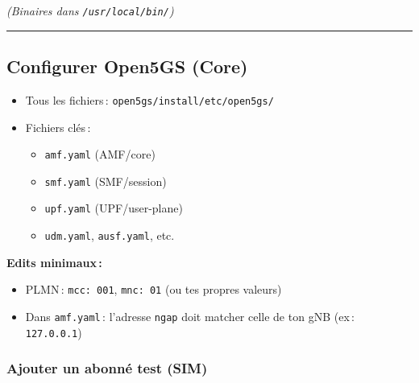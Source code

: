 \documentclass[
  french,
]{article}
\newenvironment{Shaded}{\begin{snugshade}}{\end{snugshade}}
\newcommand{\AttributeTok}[1]{\textcolor[rgb]{0.13,0.29,0.53}{#1}}
\newcommand{\BuiltInTok}[1]{#1}
\newcommand{\FunctionTok}[1]{\textcolor[rgb]{0.13,0.29,0.53}{\textbf{#1}}}
\newcommand{\KeywordTok}[1]{\textcolor[rgb]{0.13,0.29,0.53}{\textbf{#1}}}
\newcommand{\NormalTok}[1]{#1}
\newcommand{\VariableTok}[1]{\textcolor[rgb]{0.00,0.00,0.00}{#1}}
\providecommand{\tightlist}{%
  \setlength{\itemsep}{0pt}\setlength{\parskip}{0pt}}
\begin{document}
\begin{Shaded}
\end{Shaded}

\emph{(Binaires dans \texttt{/usr/local/bin/})}

\begin{center}\rule{0.5\linewidth}{0.5pt}\end{center}

\subsection{Configurer Open5GS (Core)}\label{configurer-open5gs-core}

\begin{itemize}
\item
  Tous les fichiers\,: \texttt{open5gs/install/etc/open5gs/}
\item
  Fichiers clés\,:

  \begin{itemize}
  \tightlist
  \item
    \texttt{amf.yaml} (AMF/core)
  \item
    \texttt{smf.yaml} (SMF/session)
  \item
    \texttt{upf.yaml} (UPF/user-plane)
  \item
    \texttt{udm.yaml}, \texttt{ausf.yaml}, etc.
  \end{itemize}
\end{itemize}

\textbf{Edits minimaux\,:}

\begin{itemize}
\tightlist
\item
  PLMN\,: \texttt{mcc:\ 001}, \texttt{mnc:\ 01} (ou tes propres valeurs)
\item
  Dans \texttt{amf.yaml}\,: l'adresse \texttt{ngap} doit matcher celle
  de ton gNB (ex\,: \texttt{127.0.0.1})
\end{itemize}

\subsubsection{Ajouter un abonné test
(SIM)}\label{ajouter-un-abonnuxe9-test-sim}
\end{document}
